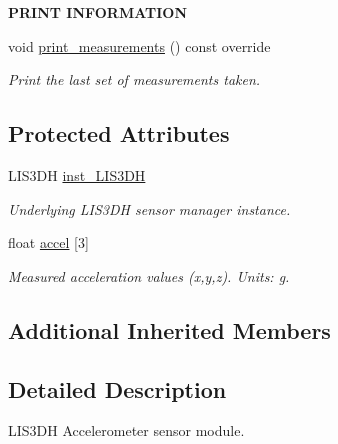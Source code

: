 \begin{Indent}{\bf P\+R\+I\+NT I\+N\+F\+O\+R\+M\+A\+T\+I\+ON}\par
\begin{DoxyCompactItemize}
\item 
void \hyperlink{class_loom___l_i_s3_d_h_acea35697172f7a88b89cd963d12ce145}{print\+\_\+measurements} () const override
\begin{DoxyCompactList}\small\item\em Print the last set of measurements taken. \end{DoxyCompactList}\end{DoxyCompactItemize}
\end{Indent}
\subsection*{Protected Attributes}
\begin{DoxyCompactItemize}
\item 
L\+I\+S3\+DH \hyperlink{class_loom___l_i_s3_d_h_a1f063e7cac82509ec31e9d5e0715db1f}{inst\+\_\+\+L\+I\+S3\+DH}
\begin{DoxyCompactList}\small\item\em Underlying L\+I\+S3\+DH sensor manager instance. \end{DoxyCompactList}\item 
float \hyperlink{class_loom___l_i_s3_d_h_a592a7fce4016957246d2ad5b39bd5d0e}{accel} \mbox{[}3\mbox{]}
\begin{DoxyCompactList}\small\item\em Measured acceleration values (x,y,z). Units\+: g. \end{DoxyCompactList}\end{DoxyCompactItemize}
\subsection*{Additional Inherited Members}


\subsection{Detailed Description}
L\+I\+S3\+DH Accelerometer sensor module. 

